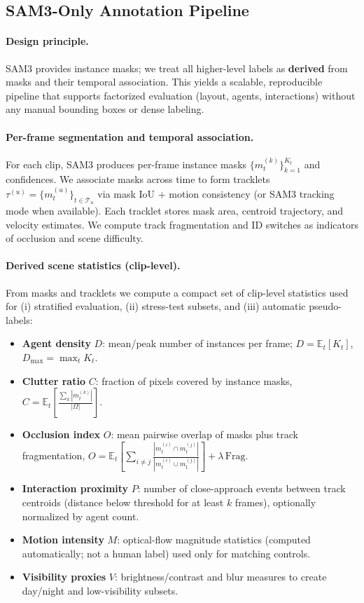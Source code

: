 \subsection{SAM3-Only Annotation Pipeline}
\label{sec:indiasuburb5k_sam3}

\paragraph{Design principle.}
SAM3 provides instance masks; we treat all higher-level labels as \textbf{derived} from masks and their temporal association. This yields a scalable, reproducible pipeline that supports factorized evaluation (layout, agents, interactions) without any manual bounding boxes or dense labeling.

\paragraph{Per-frame segmentation and temporal association.}
For each clip, SAM3 produces per-frame instance masks $\{m_{t}^{(k)}\}_{k=1}^{K_t}$ and confidences. We associate masks across time to form tracklets $\tau^{(u)}=\{m_{t}^{(u)}\}_{t\in \mathcal{T}_u}$ via mask IoU + motion consistency (or SAM3 tracking mode when available). Each tracklet stores mask area, centroid trajectory, and velocity estimates. We compute track fragmentation and ID switches as indicators of occlusion and scene difficulty.

\paragraph{Derived scene statistics (clip-level).}
From masks and tracklets we compute a compact set of clip-level statistics used for (i) stratified evaluation, (ii) stress-test subsets, and (iii) automatic pseudo-labels:
\begin{itemize}[leftmargin=*,itemsep=2pt]
  \item \textbf{Agent density} $D$: mean/peak number of instances per frame; $D=\mathbb{E}_t[K_t]$, $D_{\max}=\max_t K_t$.
  \item \textbf{Clutter ratio} $C$: fraction of pixels covered by instance masks, $C=\mathbb{E}_t\left[\frac{\sum_k |m_t^{(k)}|}{|\Omega|}\right]$.
  \item \textbf{Occlusion index} $O$: mean pairwise overlap of masks plus track fragmentation, $O=\mathbb{E}_t\left[\sum_{i\neq j}\frac{|m_t^{(i)}\cap m_t^{(j)}|}{|m_t^{(i)}\cup m_t^{(j)}|}\right] + \lambda\,\mathrm{Frag}$.
  \item \textbf{Interaction proximity} $P$: number of close-approach events between track centroids (distance below threshold for at least $k$ frames), optionally normalized by agent count.
  \item \textbf{Motion intensity} $M$: optical-flow magnitude statistics (computed automatically; not a human label) used only for matching controls.
  \item \textbf{Visibility proxies} $V$: brightness/contrast and blur measures to create day/night and low-visibility subsets.
\end{itemize}

